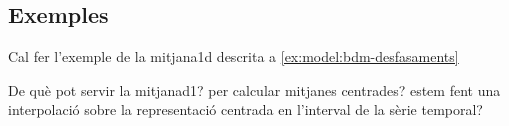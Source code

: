 \subsection{Exemples}

\todo{}
Cal fer l'exemple de la mitjana1d descrita a \ref{ex:model:bdm-desfasaments}

De què pot servir la mitjanad1? per calcular mitjanes centrades? estem fent una interpolació sobre la representació centrada en l'interval de la sèrie temporal? \todo{}







